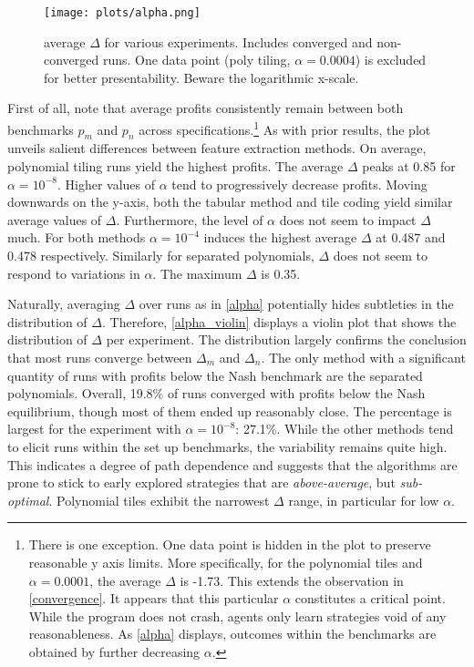 \begin{figure}
	\texttt{[image: plots/alpha.png]}
	\caption{average $\Delta$ for various experiments. Includes converged and non-converged runs. One data point (poly tiling, $\alpha = 0.0004$) is excluded for better presentability. Beware the logarithmic x-scale.}
	\label{alpha}
\end{figure}

First of all, note that average profits consistently remain between both benchmarks $p_m$ and $p_n$ across specifications.\footnote{There is one exception. One data point is hidden in the plot to preserve reasonable y axis limits. More specifically, for the polynomial tiles and $\alpha = 0.0001$, the average $\Delta$ is -1.73. This extends the observation in \autoref{convergence}. It appears that this particular $\alpha$ constitutes a critical point. While the program does not crash, agents only learn strategies void of any reasonableness. As \autoref{alpha} displays, outcomes within the benchmarks are obtained by further decreasing $\alpha$.} As with prior results, the plot unveils salient differences between feature extraction methods.  On average, polynomial tiling runs yield the highest profits. The average $\Delta$ peaks at 0.85 for $\alpha = 10^{-8}$. Higher values of $\alpha$ tend to progressively decrease profits. Moving downwards on the y-axis, both the tabular method and tile coding yield similar average values of $\Delta$. Furthermore, the level of $\alpha$ does not seem to impact $\Delta$ much. For both methods $\alpha = 10^{-4}$ induces the highest average $\Delta$ at 0.487 and 0.478 respectively. Similarly for separated polynomials, $\Delta$ does not seem to respond to variations in $\alpha$. The maximum $\Delta$ is 0.35.

Naturally, averaging $\Delta$ over runs as in \autoref{alpha} potentially hides subtleties in the distribution of $\Delta$. Therefore, \autoref{alpha_violin} displays a violin plot that shows the distribution of $\Delta$ per experiment. The distribution largely confirms the conclusion that most runs converge between $\Delta_m$ and $\Delta_n$. The only method with a significant quantity of runs with profits below the Nash benchmark are the separated polynomials. Overall, 19.8\% of runs converged with profits below the Nash equilibrium, though most of them ended up reasonably close. The percentage is largest for the experiment with $\alpha = 10^{-8}$: 27.1\%. While the other methods tend to elicit runs within the set up benchmarks, the variability remains quite high. This indicates a degree of path dependence and suggests that the algorithms are prone to stick to early explored strategies that are \emph{above-average}, but \emph{sub-optimal}. Polynomial tiles exhibit the narrowest $\Delta$ range, in particular for low $\alpha$.

